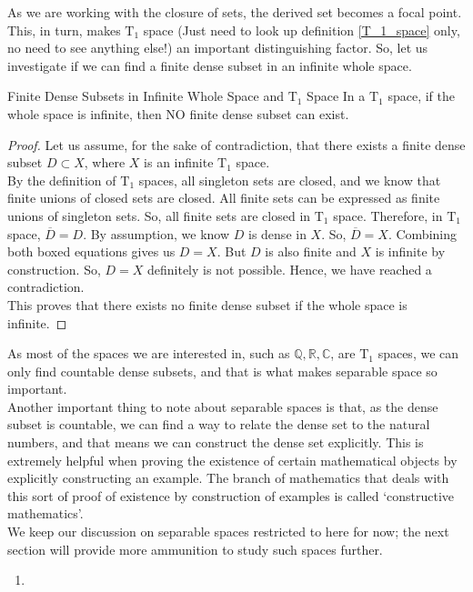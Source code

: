 \noindent As we are working with the closure of sets, the derived set becomes a focal point. This, in turn, makes $\mathrm{T}_1$ space (Just need to look up definition \eqref{T_1_space} only, no need to see anything else!) an important distinguishing factor. So, let us investigate if we can find a finite dense subset in an infinite whole space.
\begin{Theorem}{Finite Dense Subsets in Infinite Whole Space and $\mathrm{T}_1$ Space}
    In a $\mathrm{T}_1$ space, if the whole space is infinite, then NO finite dense subset can exist.
\end{Theorem}
\begin{proof}
    Let us assume, for the sake of contradiction, that there exists a finite dense subset $D\subset X$, where $X$ is an infinite $\mathrm{T}_1$ space.\\
    By the definition of $\mathrm{T}_1$ spaces, all singleton sets are closed, and we know that finite unions of closed sets are closed. All finite sets can be expressed as finite unions of singleton sets. So, all finite sets are closed in $\mathrm{T}_1$ space. Therefore, in $\mathrm{T}_1$ space, $\boxed{\overline{D}=D}$. By assumption, we know $D$ is dense in $X$. So, $\boxed{\overline{D}=X}$. Combining both boxed equations gives us $D=X$. But $D$ is also finite and $X$ is infinite by construction. So, $D=X$ definitely is not possible. Hence, we have reached a contradiction.\\
    This proves that there exists no finite dense subset if the whole space is infinite.
\end{proof}
\noindent As most of the spaces we are interested in, such as $\mathbb{Q, R, C}$, are $\mathrm{T}_1$ spaces, we can only find countable dense subsets, and that is what makes separable space so important.\\
Another important thing to note about separable spaces is that, as the dense subset is countable, we can find a way to relate the dense set to the natural numbers, and that means we can construct the dense set explicitly. This is extremely helpful when proving the existence of certain mathematical objects by explicitly constructing an example. The branch of mathematics that deals with this sort of proof of existence by construction of examples is called `constructive mathematics'.\\
We keep our discussion on separable spaces restricted to here for now; the next section will provide more ammunition to study such spaces further.
\exercise
\begin{enumerate}[label=\textbf{\arabic*.}]
	\item 
\end{enumerate}
